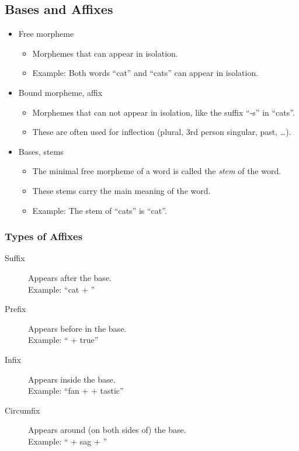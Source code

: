 		\subsection{Bases and Affixes} %
			\begin{itemize}
				\item Free morpheme
					\begin{itemize}
						\item Morphemes that can appear in isolation.
						\item Example: Both words \enquote{cat} and \enquote{cats} can appear in isolation.
					\end{itemize}
				\item Bound morpheme, affix
					\begin{itemize}
						\item Morphemes that can not appear in isolation, like the suffix \enquote{-s} in \enquote{cats}.
						\item These are often used for inflection (plural, 3rd person singular, past, \dots).
					\end{itemize}
				\item Bases, stems
					\begin{itemize}
						\item The minimal free morpheme of a word is called the \textit{stem} of the word.
						\item These stems carry the main meaning of the word.
						\item Example: The stem of \enquote{cats} is \enquote{cat}.
					\end{itemize}
			\end{itemize}

			\subsubsection{Types of Affixes} %
				\begin{description}
					\item[Suffix] Appears after the base. \\ Example: \enquote{cat + }
					\item[Prefix] Appears before in the base. \\ Example: \enquote{ + true}
					\item[Infix] Appears inside the base. \\ Example: \enquote{fan +  + tastic}
					\item[Circumfix] Appears around (on both sides of) the base. \\ Example: \enquote{ + sag + }
				\end{description}

